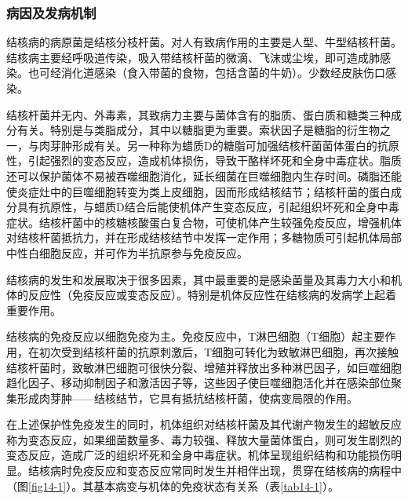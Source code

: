 \subsubsection{病因及发病机制}

结核病的病原菌是结核分枝杆菌。对人有致病作用的主要是人型、牛型结核杆菌。结核病主要经呼吸道传染，吸入带结核杆菌的微滴、飞沫或尘埃，即可造成肺感染。也可经消化道感染（食入带菌的食物，包括含菌的牛奶）。少数经皮肤伤口感染。

结核杆菌并无内、外毒素，其致病力主要与菌体含有的脂质、蛋白质和糖类三种成分有关。特别是与类脂成分，其中以糖脂更为重要。索状因子是糖脂的衍生物之一，与肉芽肿形成有关。另一种称为蜡质D的糖脂可加强结核杆菌菌体蛋白的抗原性，引起强烈的变态反应，造成机体损伤，导致干酪样坏死和全身中毒症状。脂质还可以保护菌体不易被吞噬细胞消化，延长细菌在巨噬细胞内生存时间。磷脂还能使炎症灶中的巨噬细胞转变为类上皮细胞，因而形成结核结节；结核杆菌的蛋白成分具有抗原性，与蜡质D结合后能使机体产生变态反应，引起组织坏死和全身中毒症状。结核杆菌中的核糖核酸蛋白复合物，可使机体产生较强免疫反应，增强机体对结核杆菌抵抗力，并在形成结核结节中发挥一定作用；多糖物质可引起机体局部中性白细胞反应，并可作为半抗原参与免疫反应。

结核病的发生和发展取决于很多因素，其中最重要的是感染菌量及其毒力大小和机体的反应性（免疫反应或变态反应）。特别是机体反应性在结核病的发病学上起着重要作用。

结核病的免疫反应以细胞免疫为主。免疫反应中，T淋巴细胞（T细胞）起主要作用，在初次受到结核杆菌的抗原刺激后，T细胞可转化为致敏淋巴细胞，再次接触结核杆菌时，致敏淋巴细胞可很快分裂、增殖并释放出多种淋巴因子，如巨噬细胞趋化因子、移动抑制因子和激活因子等，这些因子使巨噬细胞活化并在感染部位聚集形成肉芽肿------结核结节，它具有抵抗结核杆菌，使病变局限的作用。

在上述保护性免疫发生的同时，机体组织对结核杆菌及其代谢产物发生的超敏反应称为变态反应，如果细菌数量多、毒力较强、释放大量菌体蛋白，则可发生剧烈的变态反应，造成广泛的组织坏死和全身中毒症状。机体呈现组织结构和功能损伤明显。结核病时免疫反应和变态反应常同时发生并相伴出现，贯穿在结核病的病程中（图\ref{fig14-1}）。其基本病变与机体的免疫状态有关系（表\ref{tab14-1}）。

